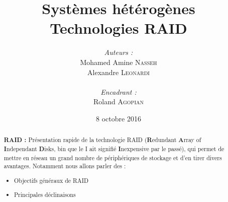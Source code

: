\documentclass[a4paper,11pt]{article}
\title{
  \textbf{Systèmes hétérogènes}\\
  Technologies RAID
}
\author{
\begin{minipage}{0.4\textwidth}
	\begin{flushleft} \large
		\emph{Auteurs :}\\
        Mohamed Amine \textsc{Nasseh}\\
		Alexandre \textsc{Leonardi}\\
	\end{flushleft}
\end{minipage}
\begin{minipage}{0.4\textwidth}
	\begin{flushright} \large
		\emph{Encadrant :} \\
		Roland \textsc{Agopian}\\
	\end{flushright}
\end{minipage}
}
\date{8 octobre 2016}
\begin{document}
\maketitle
\thispagestyle{empty}
\begin{abstract}
\textbf{RAID :} Présentation rapide de la technologie RAID (\textbf{R}edundant \textbf{A}rray of \textbf{I}ndependant \textbf{D}isks, bin que le I ait signifié \textbf{I}nexpensive par le passé), qui permet de mettre en réseau un grand nombre de périphériques de stockage et d'en tirer divers avantages. Notamment nous allons parler des :
\begin{itemize}
	\item Objectifs généraux de RAID
    \item Principales déclinaisons 
\end{itemize}
\end{abstract}
\pagebreak

\tableofcontents
\pagebreak



\pagebreak

\pagebreak

\pagebreak

\pagebreak
\nocite{*}

\end{document}
